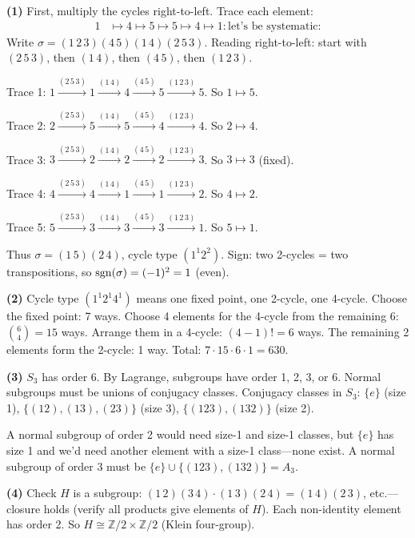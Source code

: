 \documentclass{report}
\begin{document}
\begin{solution}
\textbf{(1)} First, multiply the cycles right-to-left. Trace each element:
\begin{align*}
1 &\mapsto 4 \mapsto 5 \mapsto 5 \mapsto 4 \mapsto 1: \text{let's be systematic:}
\end{align*}
Write \(\sigma = (1\,2\,3)(4\,5)(1\,4)(2\,5\,3)\). Reading right-to-left: start with \((2\,5\,3)\), then \((1\,4)\), then \((4\,5)\), then \((1\,2\,3)\).

Trace 1: \(1 \xrightarrow{(2\,5\,3)} 1 \xrightarrow{(1\,4)} 4 \xrightarrow{(4\,5)} 5 \xrightarrow{(1\,2\,3)} 5\). So \(1 \mapsto 5\).

Trace 2: \(2 \xrightarrow{(2\,5\,3)} 5 \xrightarrow{(1\,4)} 5 \xrightarrow{(4\,5)} 4 \xrightarrow{(1\,2\,3)} 4\). So \(2 \mapsto 4\).

Trace 3: \(3 \xrightarrow{(2\,5\,3)} 2 \xrightarrow{(1\,4)} 2 \xrightarrow{(4\,5)} 2 \xrightarrow{(1\,2\,3)} 3\). So \(3 \mapsto 3\) (fixed).

Trace 4: \(4 \xrightarrow{(2\,5\,3)} 4 \xrightarrow{(1\,4)} 1 \xrightarrow{(4\,5)} 1 \xrightarrow{(1\,2\,3)} 2\). So \(4 \mapsto 2\).

Trace 5: \(5 \xrightarrow{(2\,5\,3)} 3 \xrightarrow{(1\,4)} 3 \xrightarrow{(4\,5)} 3 \xrightarrow{(1\,2\,3)} 1\). So \(5 \mapsto 1\).

Thus \(\sigma = (1\,5)(2\,4)\), cycle type \((1^1 2^2)\). Sign: two 2-cycles = two transpositions, so \(\operatorname{sgn}(\sigma) = (-1)^2 = 1\) (even).

\textbf{(2)} Cycle type \((1^1 2^1 4^1)\) means one fixed point, one 2-cycle, one 4-cycle. Choose the fixed point: 7 ways. Choose 4 elements for the 4-cycle from the remaining 6: \(\binom{6}{4} = 15\) ways. Arrange them in a 4-cycle: \((4-1)! = 6\) ways. The remaining 2 elements form the 2-cycle: 1 way. Total: \(7 \cdot 15 \cdot 6 \cdot 1 = 630\).

\textbf{(3)} \(S_3\) has order 6. By Lagrange, subgroups have order 1, 2, 3, or 6. Normal subgroups must be unions of conjugacy classes. Conjugacy classes in \(S_3\): \(\{e\}\) (size 1), \(\{(12), (13), (23)\}\) (size 3), \(\{(123), (132)\}\) (size 2). 

A normal subgroup of order 2 would need size-1 and size-1 classes, but \(\{e\}\) has size 1 and we'd need another element with a size-1 class---none exist. A normal subgroup of order 3 must be \(\{e\} \cup \{(123), (132)\} = A_3\). \checkmark

\textbf{(4)} Check \(H\) is a subgroup: \((1\,2)(3\,4) \cdot (1\,3)(2\,4) = (1\,4)(2\,3)\), etc.---closure holds (verify all products give elements of \(H\)). Each non-identity element has order 2. So \(H \cong \mathbb{Z}/2 \times \mathbb{Z}/2\) (Klein four-group).


\end{solution}
\end{document}
